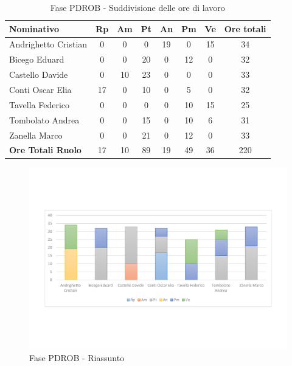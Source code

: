 \documentclass[../PianoProgetto.tex]{subfiles}
\begin{document}
	
	\begin{table}[h]
	
		\begin{tabularx}{\textwidth}{l  * {6}{C}  c}
			\toprule
			\textbf{Nominativo} & \textbf{Rp} & \textbf{Am} & \textbf{Pt} 
						& \textbf{An} & \textbf{Pm} & \textbf{Ve} & \textbf{Ore totali} \\
			\midrule
			Andrighetto Cristian & 0 &	0 &	0 &	19 & 0 & 15 & 34 \\
			Bicego Eduard & 0 &	0 &	20 & 0 & 12 & 0 & 32 \\
			Castello Davide & 0 & 10 & 23 &	0 &	0 &	0 &	33 \\
			Conti Oscar Elia & 17 &	0 &	10 & 0 & 5 & 0 & 32 \\
			Tavella Federico &	0 &	0 &	0 &	0 &	10 & 15 & 25 \\
			Tombolato Andrea & 0 & 0 &	15 & 0 & 10 & 6 & 31 \\
			Zanella Marco & 0 & 0 &	21 & 0 & 12 & 0 & 33 \\
			\midrule			
			\textbf{Ore Totali Ruolo} & 17 & 10 & 89 & 19 & 49 &	36 & 220 \\
			\bottomrule
		\end{tabularx}
		\caption{Fase PDROB - Suddivisione delle ore di lavoro}
		\label{tab:fasePDROB_ore}
	\end{table}
\vfill
\newpage
\vfill	
		
	\begin{figure}[!h]
		\centering
		\includegraphics[width=\textwidth , trim=2cm 5cm 2cm 5cm]{grafici/PDROB/PDROB-ore-persona}
			\caption{Fase PDROB - Riassunto}
		\label{fig:BarChart-fasePDROB_ore}
	\end{figure}
\vfill	
\end{document}
